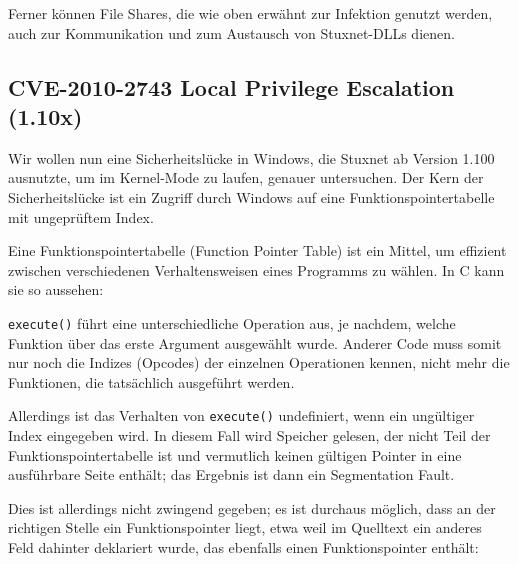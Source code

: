 \documentclass[a4paper]{article}
\begin{document}
Ferner können File Shares, die wie oben erwähnt zur Infektion genutzt werden,
auch zur Kommunikation und zum Austausch von Stuxnet-DLLs dienen.

\subsection{CVE-2010-2743 Local Privilege Escalation (1.10x)}

Wir wollen nun eine Sicherheitslücke in Windows, die Stuxnet ab Version 1.100 ausnutzte, um im Kernel-Mode zu laufen, genauer untersuchen.
Der Kern der Sicherheitslücke ist ein Zugriff durch Windows auf eine Funktionspointertabelle mit ungeprüftem Index.

Eine Funktionspointertabelle (Function Pointer Table) ist ein Mittel,
um effizient zwischen verschiedenen Verhaltensweisen eines Programms zu wählen.
In C kann sie so aussehen:



\texttt{execute()} führt eine unterschiedliche Operation aus, je nachdem, welche Funktion über das erste Argument ausgewählt wurde.
Anderer Code muss somit nur noch die Indizes (Opcodes) der einzelnen Operationen kennen, nicht mehr die Funktionen, die tatsächlich ausgeführt werden.

Allerdings ist das Verhalten von \texttt{execute()} undefiniert, wenn ein ungültiger Index eingegeben wird.
In diesem Fall wird Speicher gelesen, der nicht Teil der Funktionspointertabelle ist und vermutlich keinen gültigen Pointer in eine ausführbare Seite enthält;
das Ergebnis ist dann ein Segmentation Fault.



Dies ist allerdings nicht zwingend gegeben; es ist durchaus möglich, dass an der richtigen Stelle ein Funktionspointer liegt,
etwa weil im Quelltext ein anderes Feld dahinter deklariert wurde, das ebenfalls einen Funktionspointer enthält:


\end{document}
